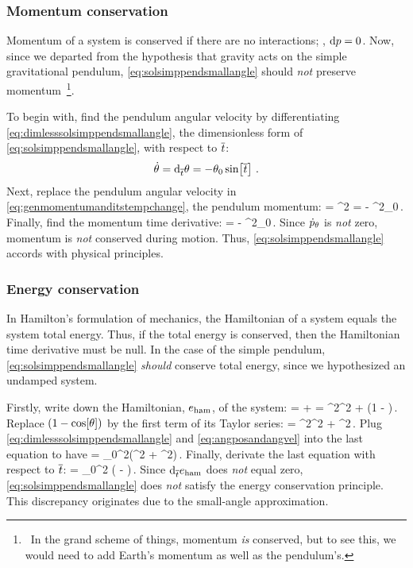 \subsubsection{Momentum conservation}
Momentum of a system is conserved if there are no interactions; \ie, $\text{d}p = 0$. Now, since we departed from the hypothesis that gravity acts on the simple gravitational pendulum, \cref{eq:solsimppendsmallangle} should \emph{not} preserve momentum~\footnote{~In the grand scheme of things, momentum \emph{is} conserved, but to see this, we would need to add Earth's momentum as well as the pendulum's.}.

To begin with, find the pendulum angular velocity by differentiating \cref{eq:dimlesssolsimppendsmallangle}, the dimensionless form of \cref{eq:solsimppendsmallangle}, with respect to $\overline{t}$:
\begin{equation}\label{eq:angposandangvel}
\dot{\theta} = \text{d}_{\overline{t}}\theta = -\theta_0\sin\!\left[{\overline{t}}\right]\,.
\end{equation}
Next, replace the pendulum angular velocity in \cref{eq:genmomentumanditstempchange}, the pendulum momentum:
\beq
\igmom\angpos = \mass\length^2\angvel 
              = - \mass\length^2\angpos_0\sin{}\,.
\eeq
Finally, find the momentum time derivative:
\beq
\dtigmom\angpos = - \mass\length^2\angpos_0\cos{}\,.
\eeq
Since ${\dot{p}}_{\theta}$ is \emph{not} zero, momentum is \emph{not} conserved during motion. Thus, \cref{eq:solsimppendsmallangle} accords with physical principles.


\subsubsection{Energy conservation}
In Hamilton's formulation of mechanics, the Hamiltonian of a system equals the system total energy. Thus, if the total energy is conserved, then the Hamiltonian time derivative must be null. In the case of the simple pendulum, \cref{eq:solsimppendsmallangle} \emph{should} conserve total energy, since we hypothesized an undamped system.

Firstly, write down the Hamiltonian, $e_\text{ham}$, of the system:
\beq
\ham = \ken + \pen 
     = \mass\length^2\angvel^2 + \mass\grav\length\left(1 - \cos\vat{\angpos}\right)\,. 
\eeq
Replace $\left(1 - \cos\!\left[{\theta}\right]\right)$ by the first term of its Taylor series:
\ham = \mass\length^2\angvel^2 + \mass\grav\length\angpos^2\,. 
\eeq
Plug \cref{eq:dimlesssolsimppendsmallangle} and \cref{eq:angposandangvel} into the last equation to have
\ham = \mass\length\angpos_0^2\left(\length\sin^2 + \grav\cos^2\right)\,.
\eeq
Finally, derivate the last equation with respect to $\overline{t}$:
\beq
{}\ham = \mass\length\angpos_0^2
                     \left( 
                         \length\sin{}\cos{} 
                         - \grav\sin{}\cos{}
                     \right)\,.
\eeq
Since $\text{d}_{\overline{t}}e_\text{ham}$ does \emph{not} equal zero, \cref{eq:solsimppendsmallangle} does \emph{not} satisfy the energy conservation principle. This discrepancy originates due to the small-angle approximation.


